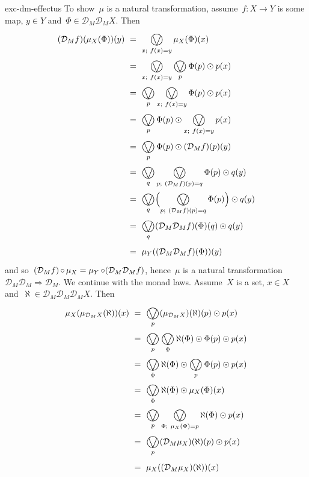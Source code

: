 \begin{solution}{exc-dm-effectus}
To show~$\mu$ is a natural transformation,
    assume~$f\colon X \to Y$ is some map, $y \in Y$ and~$\Phi \in
        \mathcal{D}_M\mathcal{D}_M X$.
Then
\begin{align*}
    (\mathcal{D}_M f) ( \mu_X(\Phi) ) (y)
    & \ = \ \bigovee_{x;\ f(x)=y} \mu_X(\Phi)(x) \\
    & \ = \ \bigovee_{x;\ f(x)=y}
            \bigovee_{p} \Phi(p) \odot p(x) \\
    & \ = \ \bigovee_{p}
                \bigovee_{x;\ f(x)=y}
            \Phi(p) \odot p(x) \\
    & \ = \ \bigovee_{p}
            \Phi(p) \odot 
                \bigovee_{x;\ f(x)=y} p(x)  \\
    & \ = \ \bigovee_{p}
            \Phi(p) \odot 
                (\mathcal{D}_M f)(p)(y) \\
    & \ = \ \bigovee_{q}
                \bigovee_{p;\ (\mathcal{D}_M f)(p) = q}
            \Phi(p) \odot q(y) \\
    & \ = \ \bigovee_{q}
               \Bigl( \bigovee_{p;\ (\mathcal{D}_M f)(p) = q}
            \Phi(p)\Bigr) \odot q(y) \\
    & \ = \ \bigovee_{q}
                    (\mathcal{D}_M \mathcal{D}_M f) (\Phi)(q) \odot q(y) \\
    & \ = \ \mu_Y (( \mathcal{D}_M \mathcal{D}_M f)(\Phi)) (y)
\end{align*}
and so~$(\mathcal{D}_M f) \mathop{\circ} \mu_X
= \mu_Y \mathop{\circ} (\mathcal{D}_M \mathcal{D}_M f)$,
 hence~$\mu$ is a natural transformation~$\mathcal{D}_M \mathcal{D}_M
    \Rightarrow \mathcal{D}_M$.
    We continue with the monad laws. Assume~$X$ is a set, $x \in X$
        and~$\aleph \in \mathcal{D}_M \mathcal{D}_M \mathcal{D}_M X$.
        Then
\begin{align*}
\mu_X ( \mu_{\mathcal{D}_M X} ( \aleph))(x)
    & \ = \ \bigovee_p (\mu_{\mathcal{D}_M X}) (\aleph) (p) \odot p(x) \\
    & \ = \ \bigovee_p \bigovee_\Phi \aleph(\Phi) \odot \Phi(p) \odot p(x) \\
    & \ = \ \bigovee_\Phi  \aleph(\Phi) \odot \bigovee_p \Phi(p) \odot p(x) \\
    & \ = \ \bigovee_\Phi  \aleph(\Phi) \odot \mu_X(\Phi)(x) \\
    & \ = \ \bigovee_p \bigovee_{\Phi; \ \mu_X(\Phi)=p}
        \aleph(\Phi) \odot p(x) \\
    & \ = \ \bigovee_p  (\mathcal{D}_M \mu_X) (\aleph) (p)\odot p(x) \\
    & \ = \ \mu_X ((\mathcal{D}_M \mu_X)(\aleph)) (x)

\end{align*}
\end{solution}
